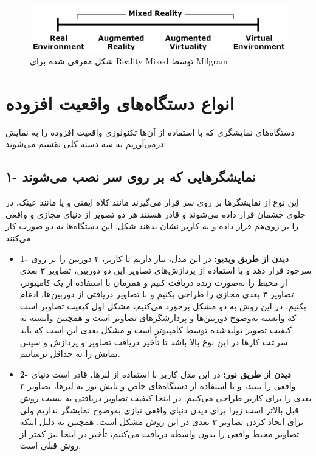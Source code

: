 \begin{figure}[!ht]
	\centering
	\includegraphics[width=1\linewidth]{image/mixedreality}
	\caption {شکل معرفی شده برای Reality Mixed توسط Milgram\cite{Milgram}}
	\label{fig:Mixed}
\end{figure}

\section{انواع دستگاه‌های واقعیت افزوده}

دستگاه‌های نمایشگری که با استفاده از آن‌ها تکنولوژی واقعیت افزوده را به نمایش درمی‌آوریم به سه دسته کلی تقسیم می‌شوند\cite{Julie}:
\\
\subsection{
	۱- نمایشگرهایی که بر روی سر نصب می‌شوند\protect{} }این نوع از نمایشگرها بر روی سر قرار می‌گیرند مانند کلاه ایمنی و یا مانند عینک، در جلوی چشمان قرار داده می‌شوند و  قادر هستند هر دو تصویر از دنیای مجازی و واقعی را بر روی‌هم قرار داده و به کاربر نشان بدهند شکل. این دستگاه‌ها به دو صورت کار می‌کنند.
\begin{itemize}
	\item \textbf{1- دیدن از طریق ویدیو:} در این مدل، نیاز داریم تا کاربر، ۲ دوربین را بر روی سرخود قرار دهد و با استفاده از پردازش‌های تصاویر این دو دوربین، تصاویر ۳ بعدی از محیط را  به‌صورت زنده دریافت کنیم و همزمان با استفاده از یک کامپیوتر، تصاویر ۳ بعدی مجازی را طراحی بکنیم و با تصاویر دریافتی از دوربین‌ها، ادغام بکنیم، در این روش به دو مشکل برخورد می‌کنیم، مشکل اول کیفیت تصاویر است که وابسته به‌وضوح  دوربین‌ها و پردازشگرهای تصاویر است و همچنین وابسته به کیفیت تصویر تولیدشده توسط کامپیوتر است و مشکل بعدی این است که باید سرعت کارها در این نوع بالا باشد تا تأخیر دریافت تصاویر و پردازش و سپس نمایش را به حداقل برسانیم.
	\item \textbf{
		2- دیدن از طریق نور: }در این مدل کاربر با استفاده از لنزها، قادر است دنیای واقعی را ببیند، و با استفاده از دستگاه‌های خاص و تابش نور به لنزها، تصاویر ۳ بعدی را برای کاربر طراحی می‌کنیم. در اینجا کیفیت تصاویر دریافتی به نسبت روش قبل بالاتر است زیرا برای دیدن دنیای واقعی نیازی به‌وضوح نمایشگر نداریم ولی برای ایجاد کردن تصاویر ۳ بعدی در این روش مشکل است. همچنین به دلیل اینکه تصاویر محیط واقعی را بدون واسطه دریافت می‌کنیم، تأخیر در اینجا نیز کمتر از روش قبلی است.
\end{itemize}

